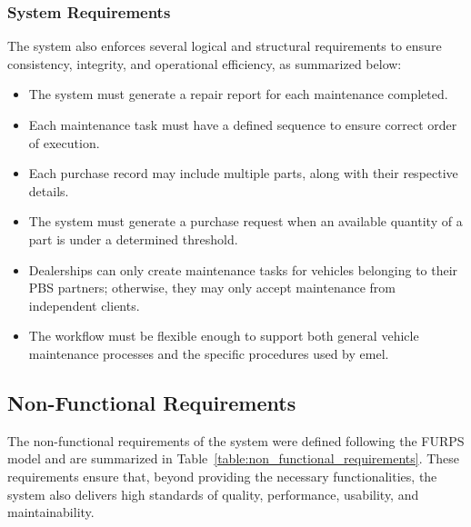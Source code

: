 \subsubsection{System Requirements}

The system also enforces several logical and structural requirements to ensure consistency, integrity, and operational efficiency, as summarized below:
 
\begin{itemize}
    \item The system must generate a repair report for each maintenance completed.
    \item Each maintenance task must have a defined sequence to ensure correct order of execution.
    \item Each purchase record may include multiple parts, along with their respective details.
    \item The system must generate a purchase request when an available quantity of a part is under a determined threshold. 
    \item Dealerships can only create maintenance tasks for vehicles belonging to their \acs{PBS} partners; otherwise, they may only accept maintenance from independent clients.
    \item The workflow must be flexible enough to support both general vehicle maintenance processes and the specific procedures used by \acs{emel}.
\end{itemize}



\subsection{Non-Functional Requirements}

The non-functional requirements of the system were defined following the FURPS model and are summarized in Table~\ref{table:non_functional_requirements}. These requirements ensure that, beyond providing the necessary functionalities, the system also delivers high standards of quality, performance, usability, and maintainability.


